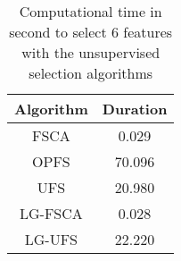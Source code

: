 \begin{table}
	\begin{center}
		\begin{tabular}{c c}
			Algorithm & Duration \\
			\hline
			FSCA & 0.029 \\
			OPFS & 70.096 \\
			UFS & 20.980 \\
			LG-FSCA & 0.028 \\
			LG-UFS & 22.220 \\
		\end{tabular}
	\end{center}
	\caption{Computational time in second to select 6 features with the unsupervised selection algorithms}
\end{table}